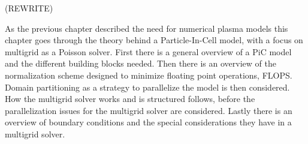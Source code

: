 
(REWRITE)

As the previous chapter described the need for numerical plasma models this chapter
goes through the theory behind a Particle-In-Cell model, with a focus on
multigrid as a Poisson solver.
First there is a general overview of a PiC model and the different building blocks
needed. Then there is an overview of the normalization scheme designed to minimize
floating point operations, FLOPS. Domain partitioning as a strategy to parallelize
the model is then considered. How the multigrid solver works and is structured follows,
before the parallelization issues for the multigrid solver are considered.
Lastly there is an overview of boundary conditions and the special considerations
they have in a multigrid solver.

